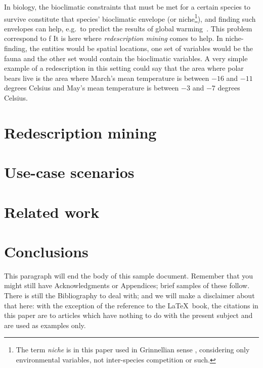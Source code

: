 \documentclass{sig-alternate}
\begin{document}
In biology, the bioclimatic constraints that must be met 
for a certain species to survive constitute that species' bioclimatic envelope
(or niche\footnote{The term \emph{niche} is in this paper used in Grinnellian
sense \cite{grinnell17niche}, considering only environmental variables, not 
inter-species competition or such.}),
and finding such envelopes can help, e.g.\ to predict the results of 
global warming~\cite{pearson03predicting}.
This problem correspond to f
It is here where \emph{redescription mining} comes to help.  In niche-finding, the entities
would be spatial locations, one set of variables would be the fauna
and the other set would contain the bioclimatic variables. A very
simple example of a redescription in this setting could say that the
area where polar bears live is the area where March's mean temperature
is between $-16$ and $-11$ degrees Celsius and May's mean temperature
is between $-3$ and $-7$ degrees Celsius.




\section{Redescription mining}

\section{Use-case scenarios}
\label{sec:scenarios}

\section{Related work}
\label{sec:related-work}




\section{Conclusions}
This paragraph will end the body of this sample document.
Remember that you might still have Acknowledgments or
Appendices; brief samples of these
follow.  There is still the Bibliography to deal with; and
we will make a disclaimer about that here: with the exception
of the reference to the \LaTeX\ book, the citations in
this paper are to articles which have nothing to
do with the present subject and are used as
examples only.



\nocite{*}
  

\balancecolumns
\end{document}
